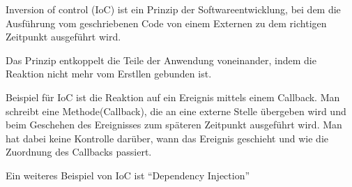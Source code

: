Inversion of control (IoC) ist ein Prinzip der Softwareentwicklung, 
bei dem die Ausführung vom geschriebenen Code von einem Externen zu dem 
richtigen Zeitpunkt ausgeführt wird.

Das Prinzip entkoppelt die Teile der Anwendung voneinander, indem die Reaktion nicht mehr vom 
Erstllen gebunden ist.

Beispiel für IoC ist die Reaktion auf ein Ereignis mittels einem Callback. 
Man schreibt eine Methode(Callback), die an eine externe Stelle übergeben wird und 
beim Geschehen des Ereignisses zum späteren Zeitpunkt ausgeführt wird. 
Man hat dabei keine Kontrolle darüber, wann das Ereignis geschieht und wie die Zuordnung des Callbacks passiert.

Ein weiteres Beispiel von IoC ist ``Dependency Injection''